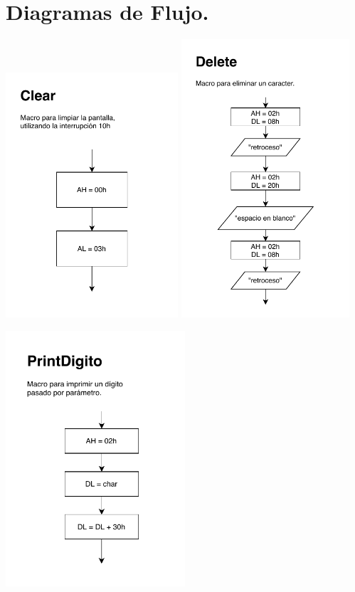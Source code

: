 \documentclass[letter,12 pt,titlepage]{article}
\begin{document}
    \section{Diagramas de Flujo.}
    \includegraphics[width=0.48\textwidth]{img/diagramas/p01-Clear}
    \includegraphics[width=0.47\textwidth]{img/diagramas/p01-Delete}

    \begin{center}
    \includegraphics[width=0.5\textwidth]{img/diagramas/p01-PrintDigito}
    \end{center}
\end{document}
